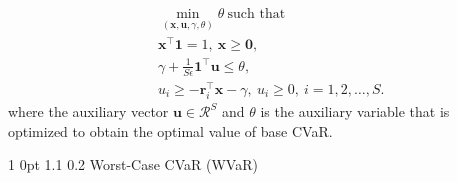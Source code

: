 \documentclass[12pt]{article}
\makeatletter
\numberwithin{equation}{section}
\renewcommand{\subsection}{
  \@startsection
  {subsection}%
  {1}%
  {0pt}%
  {1.1\baselineskip}%
  {0.2\baselineskip}%
  {\sc \centering}%
}
\makeatother
\begin{document}
\begin{eqnarray}
&&\min_{(\mathbf{x},\mathbf{u},\gamma,\theta)}\theta~\text{such that}\\ \nonumber
&&\mathbf{x}^{\top}\mathbf{1}=1,~\mathbf{x} \geq \mathbf{0},\\ \nonumber
&&\gamma+\frac{1}{S\epsilon} \mathbf{1}^{\top}\mathbf{u} \leq \theta,\\
&&u_{i} \geq -\mathbf{r}_{i}^{\top}\mathbf{x}-\gamma,~u_{i} \geq 0,~ i=1,2,\dots,S. \nonumber
\label{eq:6.7}
\end{eqnarray}
where the auxiliary vector $\mathbf{u} \in \mathcal{R}^S$ and $\theta$ is the auxiliary variable that is optimized to obtain the optimal value of base CVaR.

\subsection {Worst-Case CVaR (WVaR)}
\end{document}

